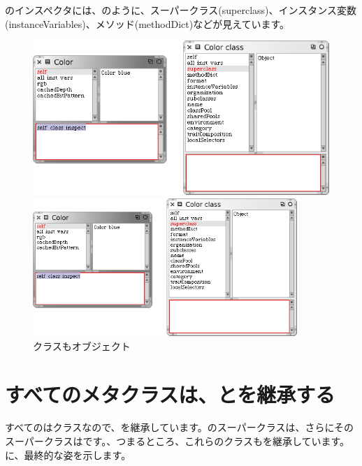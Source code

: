 \documentclass[a4paper,10pt,twoside]{book}
\begin{document}
のインスペクタには、のように、スーパークラス(superclass)、インスタンス変数(instanceVariables)、メソッド(methodDict)などが見えています。

\begin{center}
\begin{figure}[!ht]
\ifluluelse
	{\centerline{\includegraphics[width=\textwidth]{InspectingColor}}}
	{\centerline{\includegraphics[width=10cm]{InspectingColor}}}
\caption{クラスもオブジェクト}
\end{figure}
\end{center}

\section{すべてのメタクラスは、とを継承する}

すべてのはクラスなので、を継承しています。のスーパークラスは、さらにそのスーパークラスはです。、つまるところ、これらのクラスもを継承しています。に、最終的な姿を示します。
\end{document}
